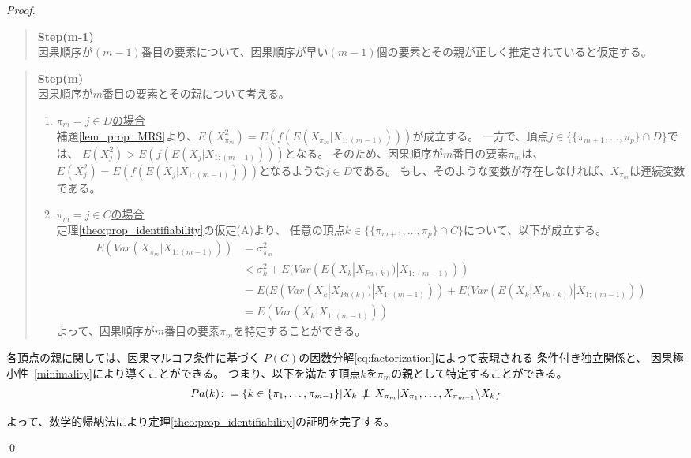 \begin{proof}
  \begin{quote}
    \textbf{Step(m-1)} \\
    因果順序が$(m-1)$番目の要素について、因果順序が早い$(m-1)$個の要素とその親が正しく推定されていると仮定する。
  \end{quote}

  \begin{quote}
    \textbf{Step(m)} \\
    因果順序が$m$番目の要素とその親について考える。
    \begin{enumerate}[label=(\roman*)]
      \item
      \underline{$\pi_m = j \in D$の場合} \\
      補題\ref{lem_prop_MRS}より、$E(X_{\pi_m}^2) = E(f(E(X_{\pi_m} | X_{1:(m-1)})))$が成立する。
      一方で、頂点$j \in \{\{ \pi_{m+1}, \dots, \pi_p\} \cap D\}$では、
      $E(X_j^2) > E(f(E(X_j | X_{1:(m-1)})))$となる。
      そのため、因果順序が$m$番目の要素$\pi_m$は、
      $E(X_j^2) = E(f(E(X_j | X_{1:(m-1)})))$となるような$j \in D$である。
      もし、そのような変数が存在しなければ、$X_{\pi_m}$は連続変数である。

      \item
      \underline{$\pi_m = j \in C$の場合} \\
      定理\ref{theo:prop_identifiability}の仮定(A)より、
      任意の頂点$k \in \{ \{ \pi_{m+1}, \dots, \pi_p \} \cap C \}$について、以下が成立する。
      \begin{align*}
        E(\mathit{Var}(X_{\pi_m} | X_{1:(m-1)}))
            &= \sigma_{\pi_m}^2 \\
            &< \sigma_k^2 + E(\mathit{Var}(E(X_k | X_{Pa(k)}) | X_{1:(m-1)})) \\
            &= E(E(\mathit{Var}(X_k | X_{Pa(k)}) | X_{1:(m-1)})) + E(\mathit{Var}(E(X_k | X_{Pa(k)}) | X_{1:(m-1)})) \\
            &= E(\mathit{Var}(X_k | X_{1:(m-1)}))
      \end{align*}
      よって、因果順序が$m$番目の要素$\pi_m$を特定することができる。

    \end{enumerate}
  \end{quote}


    各頂点の親に関しては、因果マルコフ条件に基づく
    $P(G)の因数分解$\eqref{eq:factorization}によって表現される
    条件付き独立関係と、
    因果極小性~\eqref{minimality}により導くことができる。
    つまり、以下を満たす頂点$k$を$\pi_m$の親として特定することができる。
    \begin{equation*}
      Pa(k) \colon = \{ k \in \{ \pi_1, \dots, \pi_{m-1} \} |
      X_k \notindep X_{\pi_m} | X_{\pi_1}, \dots, X_{\pi_{m-1}} \backslash X_k \}
    \end{equation*}

    よって、数学的帰納法により定理\ref{theo:prop_identifiability}の証明を完了する。

  \qed
\end{proof}
